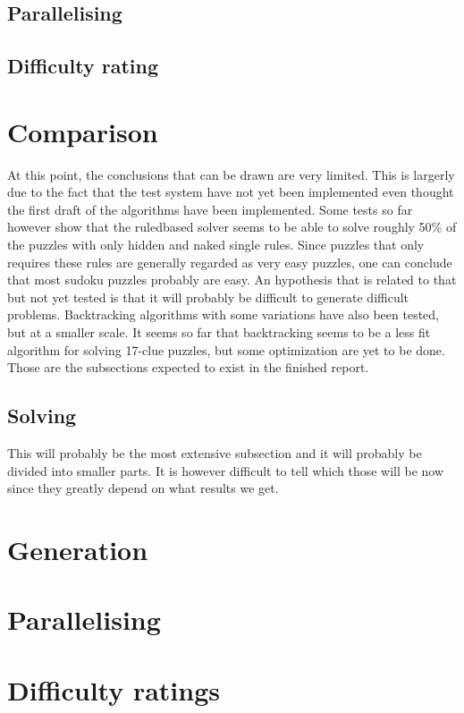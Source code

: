 \documentclass[a4paper,11pt]{kth-mag}
\begin{document}
\subsection{Parallelising}

\subsection{Difficulty rating}

\section{Comparison}

At this point, the conclusions that can be drawn are very limited.
This is largerly due to the fact that the test system have not yet been implemented even thought the first draft of the algorithms have been implemented.
Some tests so far however show that the ruledbased solver seems to be able to solve roughly 50\% of the puzzles with only hidden and naked single rules.
Since puzzles that only requires these rules are generally regarded as very easy puzzles, one can conclude that most sudoku puzzles probably are easy.
An hypothesis that is related to that but not yet tested is that it will probably be difficult to generate difficult problems.
Backtracking algorithms with some variations have also been tested, but at a smaller scale.
It seems so far that backtracking seems to be a less fit algorithm for solving 17-clue puzzles, but some optimization are yet to be done. 
Those are the subsections expected to exist in the finished report.
\subsection{Solving}

This will probably be the most extensive subsection and it will probably be divided into smaller parts.
It is however difficult to tell which those will be now since they greatly depend on what results we get.
\section{Generation}

\section{Parallelising}

\section{Difficulty ratings}
\end{document}
